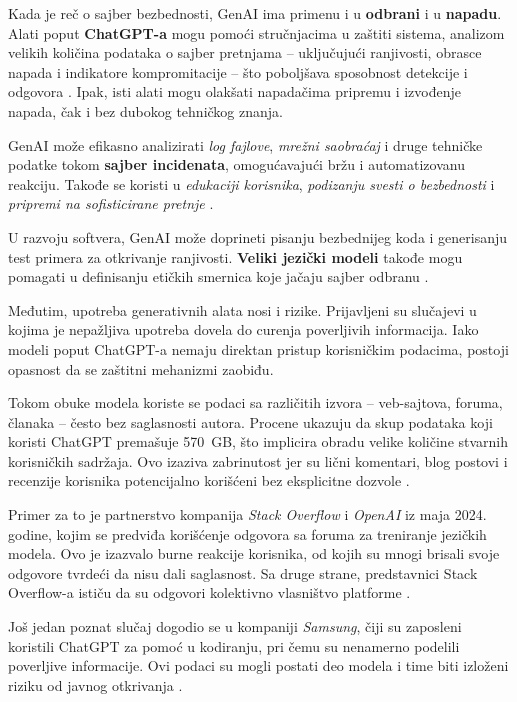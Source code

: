 \documentclass[a4paper,12pt]{article}
\begin{document}
Kada je reč o sajber bezbednosti, GenAI ima primenu i u \textbf{odbrani} i u \textbf{napadu}. Alati poput \textbf{ChatGPT-a} mogu pomoći stručnjacima u zaštiti sistema, analizom velikih količina podataka o sajber pretnjama – uključujući ranjivosti, obrasce napada i indikatore kompromitacije – što poboljšava sposobnost detekcije i odgovora \cite{10198233}. Ipak, isti alati mogu olakšati napadačima pripremu i izvođenje napada, čak i bez dubokog tehničkog znanja.

GenAI može efikasno analizirati \textit{log fajlove}, \textit{mrežni saobraćaj} i druge tehničke podatke tokom \textbf{sajber incidenata}, omogućavajući bržu i automatizovanu reakciju. Takođe se koristi u \textit{edukaciji korisnika}, \textit{podizanju svesti o bezbednosti} i \textit{pripremi na sofisticirane pretnje} \cite{10198233}. 

U razvoju softvera, GenAI može doprineti pisanju bezbednijeg koda i generisanju test primera za otkrivanje ranjivosti. \textbf{Veliki jezički modeli} takođe mogu pomagati u definisanju etičkih smernica koje jačaju sajber odbranu \cite{10198233}. 

Međutim, upotreba generativnih alata nosi i rizike. Prijavljeni su slučajevi u kojima je nepažljiva upotreba dovela do curenja poverljivih informacija. Iako modeli poput ChatGPT-a nemaju direktan pristup korisničkim podacima, postoji opasnost da se zaštitni mehanizmi zaobiđu.

Tokom obuke modela koriste se podaci sa različitih izvora – veb-sajtova, foruma, članaka – često bez saglasnosti autora. Procene ukazuju da skup podataka koji koristi ChatGPT premašuje 570~GB, što implicira obradu velike količine stvarnih korisničkih sadržaja. Ovo izaziva zabrinutost jer su lični komentari, blog postovi i recenzije korisnika potencijalno korišćeni bez eksplicitne dozvole \cite{WU2024102}. 

Primer za to je partnerstvo kompanija \textit{Stack Overflow} i \textit{OpenAI} iz maja 2024. godine, kojim se predviđa korišćenje odgovora sa foruma za treniranje jezičkih modela. Ovo je izazvalo burne reakcije korisnika, od kojih su mnogi brisali svoje odgovore tvrdeći da nisu dali saglasnost. Sa druge strane, predstavnici Stack Overflow-a ističu da su odgovori kolektivno vlasništvo platforme \cite{edwards_stackoverflow_2024}. 

Još jedan poznat slučaj dogodio se u kompaniji \textit{Samsung}, čiji su zaposleni koristili ChatGPT za pomoć u kodiranju, pri čemu su nenamerno podelili poverljive informacije. Ovi podaci su mogli postati deo modela i time biti izloženi riziku od javnog otkrivanja \cite{10198233}. 
\end{document}
